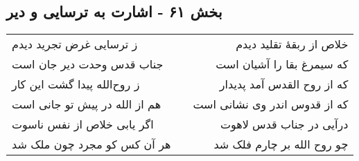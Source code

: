 \begin{center}
\section*{بخش ۶۱ - اشارت به ترسایی و دیر}
\label{sec:sh061}
\begin{longtable}{l p{0.5cm} r}
ز ترسایی غرض تجرید دیدم
&&
خلاص از ربقهٔ تقلید دیدم
\\
جناب قدس وحدت دیر جان است
&&
که سیمرغ بقا را آشیان است
\\
ز روح‌الله پیدا گشت این کار
&&
که از روح القدس آمد پدیدار
\\
هم از الله در پیش تو جانی است
&&
که از قدوس اندر وی نشانی است
\\
اگر یابی خلاص از نفس ناسوت
&&
درآیی در جناب قدس لاهوت
\\
هر آن کس کو مجرد چون ملک شد
&&
چو روح الله بر چارم فلک شد
\\
\end{longtable}
\end{center}
